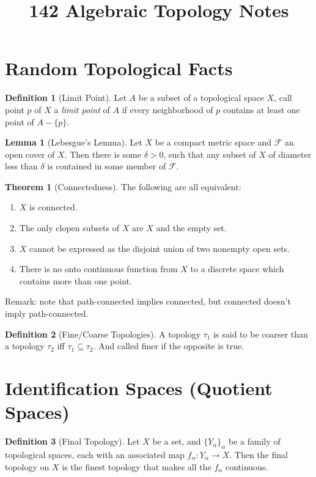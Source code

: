 \documentclass{article}
\title{142 Algebraic Topology Notes}
\theoremstyle{definition}
\newtheorem{definition}{Definition}[section]
\newtheorem{lemma}{Lemma}[section]
\newtheorem{theorem}{Theorem}[section]
\theoremstyle{remark}
\theoremstyle{remark}
\begin{document}
\section{Random Topological Facts}

\begin{definition}[Limit Point]
    Let $A$ be a subset of a topological space $X$, call point $p$ of $X$ a \textit{limit point} of $A$ if every neighborhood of $p$ contains at least one point of $A - \{p\}$. 
\end{definition}

\begin{lemma}[Lebesgue's Lemma]
    Let $X$ be a compact metric space and $\mathcal{F}$ an open cover of $X$. Then there is some $\delta > 0$, such that any subset of $X$ of diameter less than $\delta$ is contained in some member of $\mathcal{F}$.
\end{lemma}

\begin{theorem}[Connectedness]
    The following are all equivalent:
    \begin{enumerate}
        \item $X$ is connected.
        \item The only clopen subsets of $X$ are $X$ and the empty set.
        \item $X$ cannot be expressed as the disjoint union of two nonempty open sets.
        \item There is no onto continuous function from $X$ to a discrete space which contains more than one point.
    \end{enumerate}
\end{theorem}

Remark: note that path-connected implies connected, but connected doesn't imply path-connected.

\begin{definition}[Fine/Coarse Topologies]
    A topology $\tau_1$ is said to be coarser than a topology $\tau_2$ iff $\tau_1 \subseteq \tau_2$. And called finer if the opposite is true.
\end{definition}

\section{Identification Spaces (Quotient Spaces)}

\begin{definition}[Final Topology]
    Let $X$ be a set, and $\{Y_{\alpha}\}_{\alpha}$ be a family of topological spaces, each with an associated map $f_{\alpha}: Y_{\alpha} \to X$. Then the final topology on $X$ is the finest topology that makes all the $f_{\alpha}$ continuous. 
\end{definition}
\end{document}
